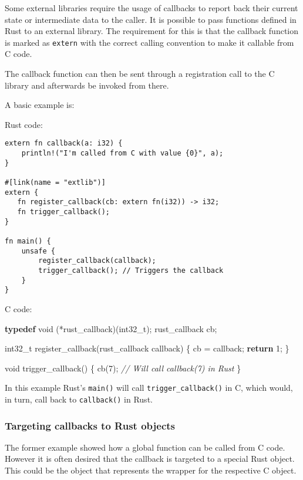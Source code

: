 \documentclass[a4paper,]{book}
\newenvironment{Shaded}{\begin{snugshade}}{\end{snugshade}}
\newcommand{\KeywordTok}[1]{\textcolor[rgb]{0.13,0.29,0.53}{\textbf{{#1}}}}
\newcommand{\DataTypeTok}[1]{\textcolor[rgb]{0.13,0.29,0.53}{{#1}}}
\newcommand{\DecValTok}[1]{\textcolor[rgb]{0.00,0.00,0.81}{{#1}}}
\newcommand{\CommentTok}[1]{\textcolor[rgb]{0.56,0.35,0.01}{\textit{{#1}}}}
\newcommand{\NormalTok}[1]{{#1}}
\begin{document}
Some external libraries require the usage of callbacks to report back
their current state or intermediate data to the caller. It is possible
to pass functions defined in Rust to an external library. The
requirement for this is that the callback function is marked as
\texttt{extern} with the correct calling convention to make it callable
from C code.

The callback function can then be sent through a registration call to
the C library and afterwards be invoked from there.

A basic example is:

Rust code:

\begin{verbatim}
extern fn callback(a: i32) {
    println!("I'm called from C with value {0}", a);
}

#[link(name = "extlib")]
extern {
   fn register_callback(cb: extern fn(i32)) -> i32;
   fn trigger_callback();
}

fn main() {
    unsafe {
        register_callback(callback);
        trigger_callback(); // Triggers the callback
    }
}
\end{verbatim}

C code:

\begin{Shaded}
\begin{Highlighting}[]
\KeywordTok{typedef} \DataTypeTok{void} \NormalTok{(*rust_callback)(}\DataTypeTok{int32_t}\NormalTok{);}
\NormalTok{rust_callback cb;}

\DataTypeTok{int32_t} \NormalTok{register_callback(rust_callback callback) \{}
    \NormalTok{cb = callback;}
    \KeywordTok{return} \DecValTok{1}\NormalTok{;}
\NormalTok{\}}

\DataTypeTok{void} \NormalTok{trigger_callback() \{}
  \NormalTok{cb(}\DecValTok{7}\NormalTok{); }\CommentTok{// Will call callback(7) in Rust}
\NormalTok{\}}
\end{Highlighting}
\end{Shaded}

In this example Rust's \texttt{main()} will call
\texttt{trigger\_callback()} in C, which would, in turn, call back to
\texttt{callback()} in Rust.

\subsubsection{Targeting callbacks to Rust
objects}\label{targeting-callbacks-to-rust-objects}

The former example showed how a global function can be called from C
code. However it is often desired that the callback is targeted to a
special Rust object. This could be the object that represents the
wrapper for the respective C object.
\end{document}
